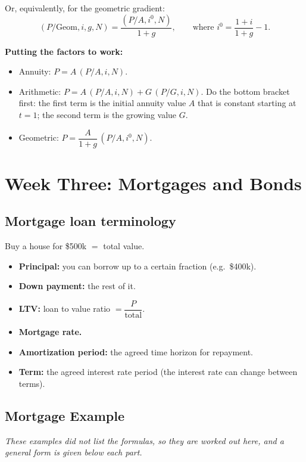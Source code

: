 \documentclass[11pt]{article}
\newcommand{\term}[1]{\textbf{\textcolor{cTerm}{#1}}}
\begin{document}
Or, equivalently, for the geometric gradient:
\[
(P/\mathrm{Geom}, i, g, N) = \frac{(P/A, i^{0}, N)}{1+g},
\qquad\text{where } i^{0} = \frac{1+i}{1+g} - 1.
\]

\textbf{Putting the factors to work:}
\begin{itemize}[nosep]
  \item Annuity: $P = A\,(P/A, i, N)$.
  \item Arithmetic: $P = A\,(P/A, i, N) + G\,(P/G, i, N)$. Do the bottom bracket
        first: the first term is the initial annuity value $A$ that is constant
        starting at $t=1$; the second term is the growing value $G$.
  \item Geometric: $P = \dfrac{A}{1+g}\,(P/A, i^{0}, N)$.
\end{itemize}

\section{Week Three: Mortgages and Bonds}

\subsection*{Mortgage loan terminology}
Buy a house for \$500k $=$ total value.
\begin{itemize}[nosep]
  \item \term{Principal:} you can borrow up to a certain fraction (e.g.\ \$400k).
  \item \term{Down payment:} the rest of it.
  \item \term{LTV:} loan to value ratio $=\dfrac{P}{\text{total}}$.
  \item \term{Mortgage rate.}
  \item \term{Amortization period:} the agreed time horizon for repayment.
  \item \term{Term:} the agreed interest rate period (the interest rate can
        change between terms).
\end{itemize}

\subsection*{Mortgage Example}
\textit{These examples did not list the formulas, so they are worked out here,
and a general form is given below each part.}
\end{document}
